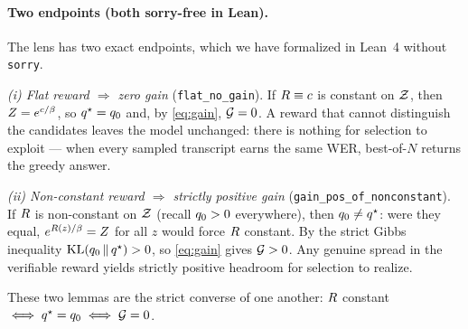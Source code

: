 \paragraph{Two endpoints (both sorry-free in Lean).}
The lens has two exact endpoints, which we have formalized in Lean~4 without \texttt{sorry}.

\emph{(i) Flat reward $\Rightarrow$ zero gain} (\texttt{flat\_no\_gain}). If $R\equiv c$ is constant
on $\mathcal{Z}$, then $Z=e^{c/\beta}$, so $q^{\star}=q_{0}$ and, by \eqref{eq:gain}, $\mathcal{G}=0$. A reward that
cannot distinguish the candidates leaves the model unchanged: there is nothing for selection to
exploit --- when every sampled transcript earns the same WER, best-of-$N$ returns the greedy answer.

\emph{(ii) Non-constant reward $\Rightarrow$ strictly positive gain} (\texttt{gain\_pos\_of\_nonconstant}).
If $R$ is non-constant on $\mathcal{Z}$ (recall $q_{0}>0$ everywhere), then $q_{0}\ne q^{\star}$: were they equal,
$e^{R(z)/\beta}=Z$ for all $z$ would force $R$ constant. By the strict Gibbs inequality
$\mathrm{KL}\!\left(q_{0} \,\|\, q^{\star}\right)>0$, so \eqref{eq:gain} gives $\mathcal{G}>0$. Any genuine spread in the verifiable reward
yields strictly positive headroom for selection to realize.

These two lemmas are the strict converse of one another: $R$ constant $\iff q^{\star}=q_{0} \iff \mathcal{G}=0$.

